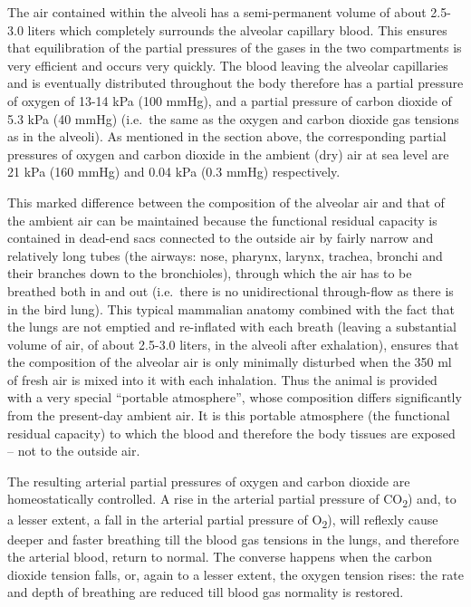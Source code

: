 The air contained within the alveoli has a semi-permanent volume of about 2.5-3.0 liters which completely surrounds the alveolar capillary blood. This ensures that equilibration of the partial pressures of the gases in the two compartments is very efficient and occurs very quickly. The blood leaving the alveolar capillaries and is eventually distributed throughout the body therefore has a partial pressure of oxygen of 13-14 kPa (100 mmHg), and a partial pressure of carbon dioxide of 5.3 kPa (40 mmHg) (i.e.~the same as the oxygen and carbon dioxide gas tensions as in the alveoli). As mentioned in the section above, the corresponding partial pressures of oxygen and carbon dioxide in the ambient (dry) air at sea level are 21 kPa (160 mmHg) and 0.04 kPa (0.3 mmHg) respectively.

This marked difference between the composition of the alveolar air and that of the ambient air can be maintained because the functional residual capacity is contained in dead-end sacs connected to the outside air by fairly narrow and relatively long tubes (the airways: nose, pharynx, larynx, trachea, bronchi and their branches down to the bronchioles), through which the air has to be breathed both in and out (i.e.~there is no unidirectional through-flow as there is in the bird lung). This typical mammalian anatomy combined with the fact that the lungs are not emptied and re-inflated with each breath (leaving a substantial volume of air, of about 2.5-3.0 liters, in the alveoli after exhalation), ensures that the composition of the alveolar air is only minimally disturbed when the 350 ml of fresh air is mixed into it with each inhalation. Thus the animal is provided with a very special ``portable atmosphere'', whose composition differs significantly from the present-day ambient air. It is this portable atmosphere (the functional residual capacity) to which the blood and therefore the body tissues are exposed -- not to the outside air.

The resulting arterial partial pressures of oxygen and carbon dioxide are homeostatically controlled. A rise in the arterial partial pressure of CO\textsubscript{2}) and, to a lesser extent, a fall in the arterial partial pressure of O\textsubscript{2}), will reflexly cause deeper and faster breathing till the blood gas tensions in the lungs, and therefore the arterial blood, return to normal. The converse happens when the carbon dioxide tension falls, or, again to a lesser extent, the oxygen tension rises: the rate and depth of breathing are reduced till blood gas normality is restored.

